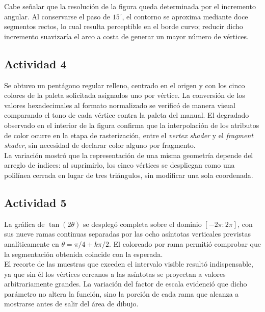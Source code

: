Cabe señalar que la resolución de la figura queda determinada por el incremento angular. Al conservarse el paso de $15^\circ$, el contorno se aproxima mediante doce segmentos rectos, lo cual resulta perceptible en el borde curvo; reducir dicho incremento suavizaría el arco a costa de generar un mayor número de vértices.\\

\subsection{Actividad 4}

Se obtuvo un pentágono regular relleno, centrado en el origen y con los cinco colores de la paleta solicitada asignados uno por vértice. La conversión de los valores hexadecimales al formato normalizado se verificó de manera visual comparando el tono de cada vértice contra la paleta del manual. El degradado observado en el interior de la figura confirma que la interpolación de los atributos de color ocurre en la etapa de rasterización, entre el \textit{vertex shader} y el \textit{fragment shader}, sin necesidad de declarar color alguno por fragmento.\\

La variación mostró que la representación de una misma geometría depende del arreglo de índices: al suprimirlo, los cinco vértices se despliegan como una polilínea cerrada en lugar de tres triángulos, sin modificar una sola coordenada.\\

\subsection{Actividad 5}

La gráfica de $\tan(2\theta)$ se desplegó completa sobre el dominio $[-2\pi : 2\pi]$, con sus nueve ramas continuas separadas por las ocho asíntotas verticales previstas analíticamente en $\theta = \pi/4 + k\pi/2$. El coloreado por rama permitió comprobar que la segmentación obtenida coincide con la esperada.\\

El recorte de las muestras que exceden el intervalo visible resultó indispensable, ya que sin él los vértices cercanos a las asíntotas se proyectan a valores arbitrariamente grandes. La variación del factor de escala evidenció que dicho parámetro no altera la función, sino la porción de cada rama que alcanza a mostrarse antes de salir del área de dibujo.\\
